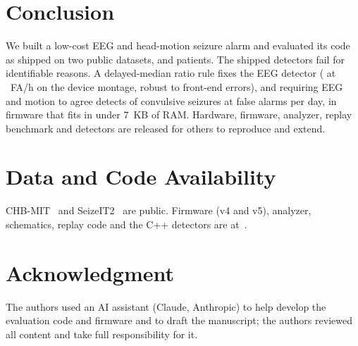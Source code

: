 \documentclass[conference,letterpaper]{IEEEtran}
\begin{document}
\section{Conclusion}
We built a low-cost EEG and head-motion seizure alarm and evaluated its code as shipped on two public datasets, \NSubj{} and \SNSubj{} patients. The shipped detectors fail for identifiable reasons. A delayed-median ratio rule fixes the EEG detector (\DevASens{} at \DevAFAh{}~FA/h on the device montage, robust to front-end errors), and requiring EEG and motion to agree detects \SCvASens{} of convulsive seizures at \SCvAFAday{} false alarms per day, in firmware that fits in under 7~KB of RAM. Hardware, firmware, analyzer, replay benchmark and detectors are released for others to reproduce and extend.

\section*{Data and Code Availability}
CHB-MIT~\cite{goldberger2000physionet} and SeizeIT2~\cite{bhagubai2025seizeit2} are public. Firmware (v4 and v5), analyzer, schematics, replay code and the C++ detectors are at~\cite{vera_repo}.

\section*{Acknowledgment}
The authors used an AI assistant (Claude, Anthropic) to help develop the evaluation code and firmware and to draft the manuscript; the authors reviewed all content and take full responsibility for it.



\end{document}
